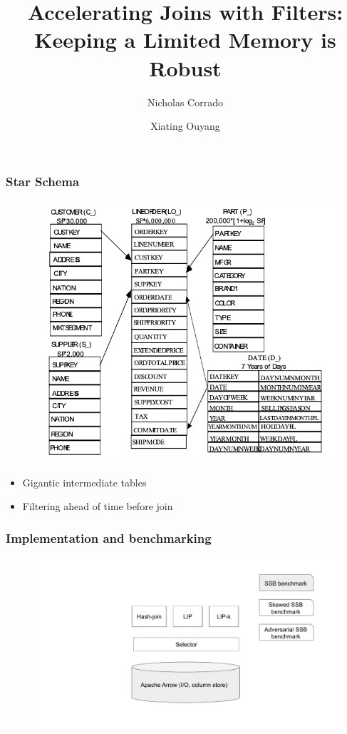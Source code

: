 \documentclass{beamer}
\title[LIP with limited memory]{Accelerating Joins with Filters: Keeping a Limited Memory is Robust} %
\author{Nicholas Corrado \and Xiating Ouyang} %
\institute[] %
{
University of Wisconsin-Madison \\ %
\medskip
\textit{} %
}
\date{} %
\begin{document}
\begin{frame}
\titlepage %
\end{frame}


\begin{frame}
\frametitle{Star Schema}
\begin{figure}
  \centering
  \includegraphics[height=0.7\textheight,keepaspectratio]{star-schema}
\end{figure}

\begin{itemize}
  \item Gigantic intermediate tables
  \item Filtering ahead of time before join
\end{itemize}
\end{frame}


{

}


\begin{frame}
  \frametitle{Implementation and benchmarking}
  \begin{figure}
    \centering
    \includegraphics[height=0.7\textheight,keepaspectratio]{implementation}
  \end{figure}
\end{frame}
\end{document}
